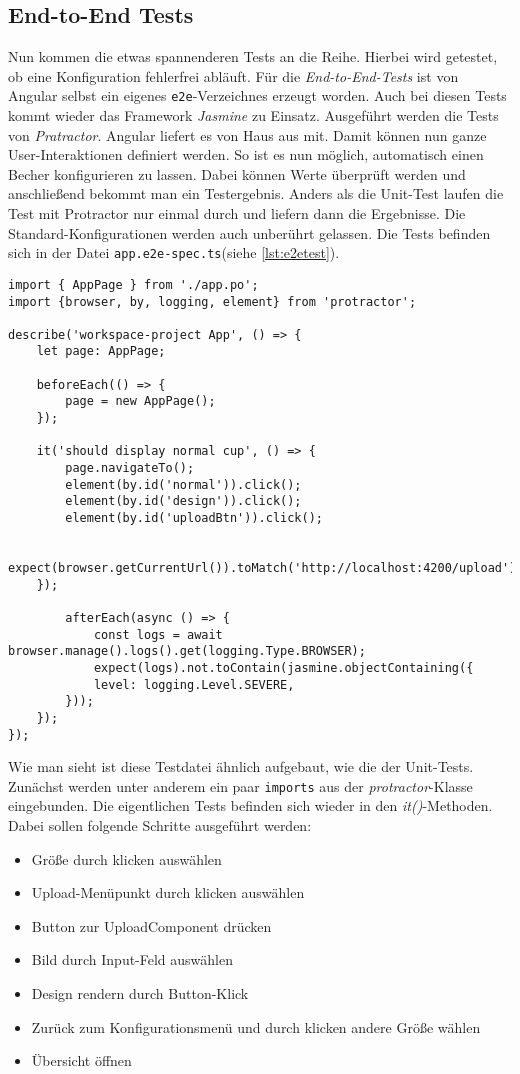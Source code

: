 \subsection{End-to-End Tests}
%
Nun kommen die etwas spannenderen Tests an die Reihe. Hierbei wird getestet, ob eine Konfiguration fehlerfrei abläuft. Für die \textit{End-to-End-Tests} ist von Angular selbst ein eigenes \texttt{e2e}-Verzeichnes erzeugt worden. Auch bei diesen Tests kommt wieder das Framework \textit{Jasmine} zu Einsatz. Ausgeführt werden die Tests von \textit{Pratractor}. Angular liefert es von Haus aus mit. Damit können nun ganze User-Interaktionen definiert werden. So ist es nun möglich, automatisch einen Becher konfigurieren zu lassen. Dabei können Werte überprüft werden und anschließend bekommt man ein Testergebnis. Anders als die Unit-Test laufen die Test mit Protractor nur einmal durch und liefern dann die Ergebnisse. Die Standard-Konfigurationen werden auch unberührt gelassen. Die Tests befinden sich in der Datei \texttt{app.e2e-spec.ts}(siehe \ref{lst:e2etest}).
%
\begin{lstlisting}[caption={app.e2e-spec.ts Datei},label=lst:e2etest]
import { AppPage } from './app.po';
import {browser, by, logging, element} from 'protractor';

describe('workspace-project App', () => {
	let page: AppPage;

	beforeEach(() => {
		page = new AppPage();
	});

	it('should display normal cup', () => {
		page.navigateTo();
		element(by.id('normal')).click();
		element(by.id('design')).click();
		element(by.id('uploadBtn')).click();

		expect(browser.getCurrentUrl()).toMatch('http://localhost:4200/upload');
	});

		afterEach(async () => {
			const logs = await browser.manage().logs().get(logging.Type.BROWSER);
			expect(logs).not.toContain(jasmine.objectContaining({
			level: logging.Level.SEVERE,
		}));
	});
});
\end{lstlisting}
%
Wie man sieht ist diese Testdatei ähnlich aufgebaut, wie die der Unit-Tests. Zunächst werden unter anderem ein paar \texttt{imports} aus der \textit{protractor}-Klasse eingebunden. Die eigentlichen Tests befinden sich wieder in den \textit{it()}-Methoden. Dabei sollen folgende Schritte ausgeführt werden:
\begin{itemize}
	\item Größe durch klicken auswählen
	\item Upload-Menüpunkt durch klicken auswählen
	\item Button zur UploadComponent drücken
	\item Bild durch Input-Feld auswählen
	\item Design rendern durch Button-Klick
	\item Zurück zum Konfigurationsmenü und durch klicken andere Größe wählen
	\item Übersicht öffnen
\end{itemize}
